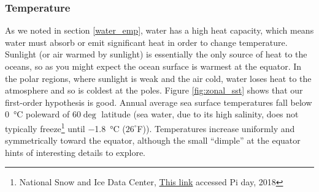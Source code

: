 \subsubsection{Temperature}\label{modern_sst}
As we noted in section \ref{water_emp}, water has a high heat capacity, which means water must absorb or emit significant heat in order to change temperature. Sunlight (or air warmed by sunlight) is essentially the only source of heat to the oceans, so as you might expect the ocean surface is warmest at the equator. In the polar regions, where sunlight is weak and the air cold, water loses heat to the atmosphere and so is coldest at the poles. Figure \ref{fig:zonal_sst} shows that our first-order hypothesis is good. Annual average sea surface temperatures fall below \SI{0}{\celsius} poleward of $60 \deg$ latitude (sea water, due to its high salinity, does not typically freeze\footnote{National Snow and Ice Data Center, \href{https://nsidc.org/cryosphere/seaice/characteristics/brine_salinity.html}{This link} accessed Pi day, 2018} until \SI{-1.8}{\celsius} ($26^{\circ}$F)). Temperatures increase uniformly and symmetrically toward the equator, although the small ``dimple'' at the equator hints of interesting details to explore.\\
